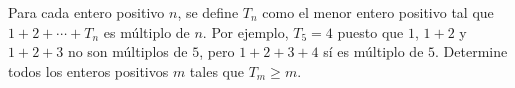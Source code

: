Para cada entero positivo $n$, se define $T_n$ como el menor entero positivo tal que $1+2+\cdots + T_n$ es múltiplo de $n$. Por ejemplo, $T_5 = 4$ puesto que $1$, $1+2$ y $1+2+3$ no son múltiplos de $5$, pero $1+2+3+4$ sí es múltiplo de $5$. \newline 
Determine todos los enteros positivos $m$ tales que $T_m \geq m$.
